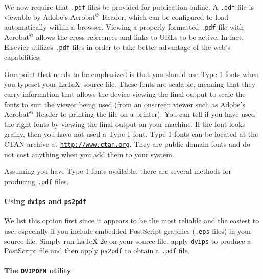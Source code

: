 \documentclass{endm}
\begin{document}
We now require that \texttt{.pdf} files be provided for publication
online. A \texttt{.pdf} file is viewable by Adobe's Acrobat$^{\copyright}$
Reader, which can be configured to load automatically within a browser.
Viewing a properly formatted \texttt{.pdf} file with Acrobat$^{\copyright}$
allows the cross-references and links to URLs to be active. In fact,
Elsevier utilizes \texttt{.pdf} files in order to take better advantage
of the web's capabilities.

One point that needs to be emphasized is that you should use Type 1
fonts when you typeset your \LaTeX\ source file. These fonts are
scalable, meaning that they carry information that allows the device
viewing the final output to scale the fonts to suit the viewer being
used (from an onscreen viewer such as Adobe's Acrobat$^{\copyright}$
Reader to printing the file on a printer). You can tell if you have
used the right fonts by viewing the final output on your machine. If
the font looks grainy, then you have not used a Type 1 font. Type 1
fonts can be located at the CTAN archive at
\href{http://www.ctan.org}{\tt http://www.ctan.org}. They are public
domain fonts and do not cost anything when you add them to your system.

Assuming you have Type 1 fonts available, there are several methods
for producing \texttt{.pdf} files.

\paragraph{Using \texttt{dvips} and \texttt{ps2pdf}}

We list this option first since it appears to be the most reliable and
the easiest to use, especially if you include embedded PostScript
graphics (\texttt{.eps} files) in your source file. Simply run \LaTeX
2e on your source file, apply \texttt{dvips} to produce a PostScript
file and then apply \texttt{ps2pdf} to obtain a \texttt{.pdf} file.

\paragraph{The \texttt{DVIPDFM} utility}
\end{document}
